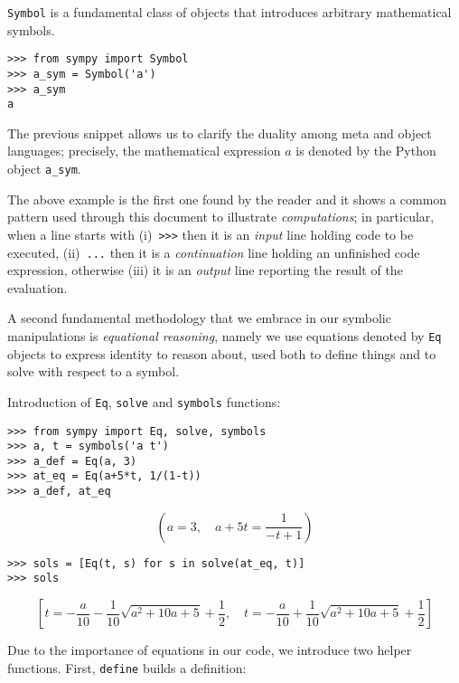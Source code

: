\begin{example}
\verb|Symbol| is a fundamental class of objects that introduces arbitrary
mathematical symbols.
\begin{verbatim}
>>> from sympy import Symbol
>>> a_sym = Symbol('a')
>>> a_sym
a
\end{verbatim}
The previous snippet allows us to clarify the duality among meta and object
languages; precisely, the mathematical expression $a$ is denoted by the Python
object \verb|a_sym|.
\end{example}

The above example is the first one found by the reader and it shows a common
pattern used through this document to illustrate \textit{computations}; in
particular, when a line starts with (i)~\verb|>>>| then it is an \textit{input}
line holding code to be executed, (ii)~\verb|...| then it is a
\textit{continuation} line holding an unfinished code expression, otherwise
(iii) it is an \textit{output} line reporting the result of the evaluation.

A second fundamental methodology that we embrace in our symbolic manipulations is
\textit{equational reasoning}, namely we use equations denoted by \verb|Eq| objects
to express identity to reason about, used both to define things and
to solve with respect to a symbol.
\begin{example}
Introduction of \verb|Eq|, \verb|solve| and \verb|symbols| functions:
\begin{verbatim}
>>> from sympy import Eq, solve, symbols
>>> a, t = symbols('a t')
>>> a_def = Eq(a, 3)
>>> at_eq = Eq(a+5*t, 1/(1-t))
>>> a_def, at_eq
\end{verbatim}
\begin{displaymath}
\left(
a=3,\quad a + 5 t = \frac{1}{- t + 1}
\right)
\end{displaymath}
\begin{verbatim}
>>> sols = [Eq(t, s) for s in solve(at_eq, t)]
>>> sols
\end{verbatim}
\begin{displaymath}
\left [ t = - \frac{a}{10} - \frac{1}{10} \sqrt{a^{2} + 10 a + 5} + \frac{1}{2}, \quad t = - \frac{a}{10} + \frac{1}{10} \sqrt{a^{2} + 10 a + 5} + \frac{1}{2}\right ]
\end{displaymath}
\end{example}

Due to the importance of equations in our code, we introduce two
helper functions. First, \verb|define| builds a definition:

